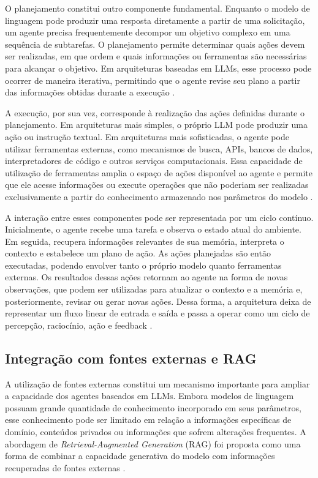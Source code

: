 O planejamento constitui outro componente fundamental. Enquanto o modelo de linguagem pode produzir uma resposta diretamente a partir de uma solicitação, um agente precisa frequentemente decompor um objetivo complexo em uma sequência de subtarefas. O planejamento permite determinar quais ações devem ser realizadas, em que ordem e quais informações ou ferramentas são necessárias para alcançar o objetivo. Em arquiteturas baseadas em LLMs, esse processo pode ocorrer de maneira iterativa, permitindo que o agente revise seu plano a partir das informações obtidas durante a execução \cite{cheng2026,zhao2023survey}.

A execução, por sua vez, corresponde à realização das ações definidas durante o planejamento. Em arquiteturas mais simples, o próprio LLM pode produzir uma ação ou instrução textual. Em arquiteturas mais sofisticadas, o agente pode utilizar ferramentas externas, como mecanismos de busca, APIs, bancos de dados, interpretadores de código e outros serviços computacionais. Essa capacidade de utilização de ferramentas amplia o espaço de ações disponível ao agente e permite que ele acesse informações ou execute operações que não poderiam ser realizadas exclusivamente a partir do conhecimento armazenado nos parâmetros do modelo \cite{zhao2023survey}.

A interação entre esses componentes pode ser representada por um ciclo contínuo. Inicialmente, o agente recebe uma tarefa e observa o estado atual do ambiente. Em seguida, recupera informações relevantes de sua memória, interpreta o contexto e estabelece um plano de ação. As ações planejadas são então executadas, podendo envolver tanto o próprio modelo quanto ferramentas externas. Os resultados dessas ações retornam ao agente na forma de novas observações, que podem ser utilizadas para atualizar o contexto e a memória e, posteriormente, revisar ou gerar novas ações. Dessa forma, a arquitetura deixa de representar um fluxo linear de entrada e saída e passa a operar como um ciclo de percepção, raciocínio, ação e feedback \cite{muller1999,cheng2026,zhao2023survey}.

\subsection{Integração com fontes externas e RAG}

A utilização de fontes externas constitui um mecanismo importante para ampliar a capacidade dos agentes baseados em LLMs. Embora modelos de linguagem possuam grande quantidade de conhecimento incorporado em seus parâmetros, esse conhecimento pode ser limitado em relação a informações específicas de domínio, conteúdos privados ou informações que sofrem alterações frequentes. A abordagem de \textit{Retrieval-Augmented Generation} (RAG) foi proposta como uma forma de combinar a capacidade generativa do modelo com informações recuperadas de fontes externas \cite{lewis2020rag}.

